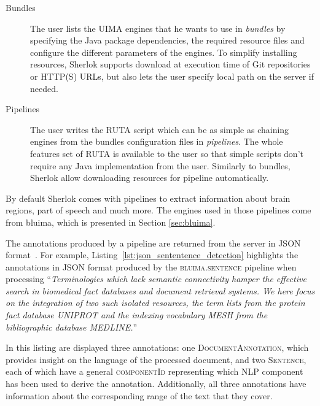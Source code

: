 \documentclass{article}
\newcommand{\ID}[1]{{\textsc{#1}}}
\begin{document}
\begin{description}
    \item[Bundles] The user lists the UIMA engines that he wants to use in \emph{bundles} by
        specifying the Java package dependencies, the required resource files and configure the
        different parameters of the engines. To simplify installing resources, Sherlok supports
        download at execution time of Git repositories or HTTP(S) URLs, but also lets the user
        specify local path on the server if needed.
    \item[Pipelines] The user writes the RUTA script which can be as simple as chaining engines from
        the bundles configuration files in \emph{pipelines}. The whole features set of RUTA is
        available to the user so that simple scripts don't require any Java implementation from the
        user. Similarly to bundles, Sherlok allow downloading resources for pipeline automatically.
\end{description}

By default Sherlok comes with pipelines to extract information about brain regions, part of speech
and much more. The engines used in those pipelines come from bluima, which is presented in Section
\ref{sec:bluima}.

The annotations produced by a pipeline are returned from the server in JSON format~\cite{json}. For
example, Listing~\ref{lst:json_sententence_detection} highlights the annotations in JSON format
produced by the \ID{bluima.sentence} pipeline when processing ``\textit{Terminologies which lack
semantic connectivity hamper the effective search in biomedical fact databases and document
retrieval systems. We here focus on the integration of two such isolated resources, the term lists
from the protein fact database UNIPROT and the indexing vocabulary MESH from the bibliographic
database MEDLINE.}''

In this listing are displayed three annotations: one \ID{DocumentAnnotation}, which provides insight
on the language of the processed document, and two \ID{Sentence}, each of which have a general
\ID{componentId} representing which NLP component has been used to derive the annotation.
Additionally, all three annotations have information about the corresponding range of the text that
they cover.
\end{document}

